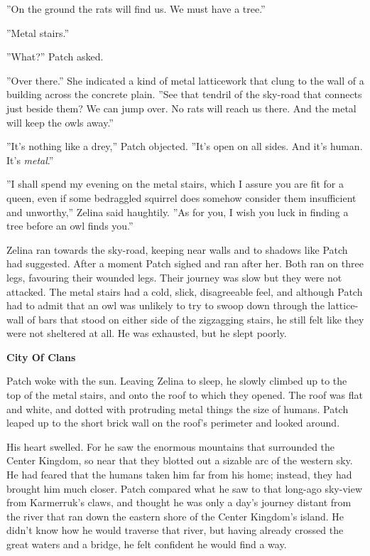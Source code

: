 \documentclass[11pt]{article}
\begin{document}
 ''On the ground the rats will find us. We must have a tree.''\par
 ''Metal stairs.''\par
 ''What?'' Patch asked.\par
 ''Over there.'' She indicated a kind of metal latticework that clung to the wall of a building across the concrete plain. ''See that tendril of the sky-road that connects just beside them? We can jump over. No rats will reach us there. And the metal will keep the owls away.''\par
 ''It's nothing like a drey,'' Patch objected. ''It's open on all sides. And it's human. It's {\it metal}.''\par
 ''I shall spend my evening on the metal stairs, which I assure you are fit for a queen, even if some bedraggled squirrel does somehow consider them insufficient and unworthy,'' Zelina said haughtily. ''As for you, I wish you luck in finding a tree before an owl finds you.''\par
 Zelina ran towards the sky-road, keeping near walls and to shadows like Patch had suggested. After a moment Patch sighed and ran after her. Both ran on three legs, favouring their wounded legs. Their journey was slow but they were not attacked. The metal stairs had a cold, slick, disagreeable feel, and although Patch had to admit that an owl was unlikely to try to swoop down through the lattice-wall of bars that stood on either side of the zigzagging stairs, he still felt like they were not sheltered at all. He was exhausted, but he slept poorly.\par
\par
{\bf City Of Clans\par
}\par
 Patch woke with the sun. Leaving Zelina to sleep, he slowly climbed up to the top of the metal stairs, and onto the roof to which they opened. The roof was flat and white, and dotted with protruding metal things the size of humans. Patch leaped up to the short brick wall on the roof's perimeter and looked around.\par
His heart swelled. For he saw the enormous mountains that surrounded the Center Kingdom, so near that they blotted out a sizable arc of the western sky. He had feared that the humans taken him far from his home; instead, they had brought him much closer. Patch compared what he saw to that long-ago sky-view from Karmerruk's claws, and thought he was only a day's journey distant from the river that ran down the eastern shore of the Center Kingdom's island. He didn't know how he would traverse that river, but having already crossed the great waters and a bridge, he felt confident he would find a way.\par
\end{document}
